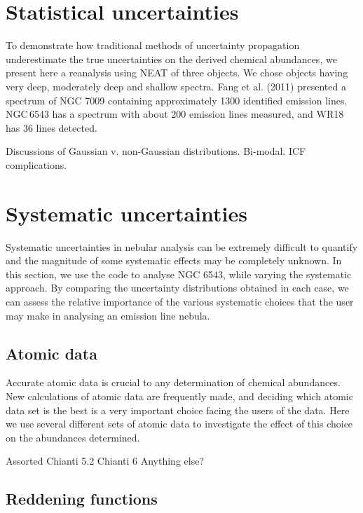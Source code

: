 \documentclass[useAMS,usenatbib]{mn2e}
\begin{document}
\section{Statistical uncertainties}

To demonstrate how traditional methods of uncertainty propagation underestimate the true uncertainties on the derived chemical abundances, we present here a reanalysis using NEAT of three objects.  We chose objects having very deep, moderately deep and shallow spectra.  Fang et al. (2011) presented a spectrum of NGC 7009 containing approximately 1300 identified emission lines.  NGC\,6543 \citep{2004MNRAS.351.1026W} has a spectrum with about 200 emission lines measured, and WR18 \citep{2011arXiv1108.3800S} has 36 lines detected.

Discussions of Gaussian v. non-Gaussian distributions.  Bi-modal.  ICF complications.

\section{Systematic uncertainties}

Systematic uncertainties in nebular analysis can be extremely difficult to quantify and the magnitude of some systematic effects may be completely unknown.  In this section, we use the code to analyse NGC 6543, while varying the systematic approach.  By comparing the uncertainty distributions obtained in each case, we can assess the relative importance of the various systematic choices that the user may make in analysing an emission line nebula.

\subsection{Atomic data}

Accurate atomic data is crucial to any determination of chemical abundances.  New calculations of atomic data are frequently made, and deciding which atomic data set is the best is a very important choice facing the users of the data.  Here we use several different sets of atomic data to investigate the effect of this choice on the abundances determined.

Assorted
Chianti 5.2
Chianti 6
Anything else?

\subsection{Reddening functions}
\end{document}

